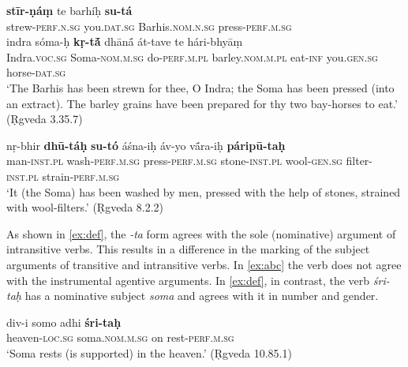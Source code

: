 \documentclass[output=paper,
modfonts
]{LSP/langsci}
\begin{document}
\begin{exe}
	\ex\label{ex:abc}
	\begin{xlist}
		\ex\label{ex:stirnam}\gll \textbf{stīr-ṇáṃ} te barhíḥ \textbf{su-tá}  \\
		strew-\textsc{perf.n.sg} you.\textsc{dat.sg} Barhis.\textsc{nom.n.sg} press-\textsc{perf.m.sg} \\
		
		\gll indra sóma-ḥ  \textbf{kṛ-tā́} dhānā́ át-tave  te hári-bhyāṃ\\
Indra.\textsc{voc.sg} Soma-\textsc{nom.m.sg}  do-\textsc{perf.m.pl}  barley.\textsc{nom.m.pl} eat-\textsc{inf}  you.\textsc{gen.sg} horse-\textsc{dat.sg}\\
\glt `The Barhis has been strewn for thee, O Indra; the Soma  has been pressed (into an extract). The barley grains  have been prepared for thy two bay-horses to eat.' (Ṛgveda 3.35.7)

		\ex\label{ex:nrbhir}\gll nṛ-bhir \textbf{dhū-táḥ}  \textbf{su-tó}  áśna-iḥ áv-yo vā́ra-iḥ \textbf{páripū-taḥ}  \\
		man-\textsc{inst.pl}  wash-\textsc{perf.m.sg}  press-\textsc{perf.m.sg}  stone-\textsc{inst.pl}  wool-\textsc{gen.sg}  filter-\textsc{inst.pl}  strain-\textsc{perf.m.sg} \\
		\glt `It (the Soma) has been washed  by men, pressed with the help of stones, strained with  wool-filters.' (Ṛgveda 8.2.2)
	\end{xlist}
\end{exe}


As shown in \cref{ex:def}, the \textit{-ta} form agrees with the sole
(nominative) argument of intransitive verbs. This results in a
difference in the marking of the subject arguments of transitive and
intransitive verbs. In \cref{ex:abc} the verb does not agree with the
instrumental agentive arguments.  In \cref{ex:def}, in contrast, the
verb \textit{śri-taḥ} has a nominative subject \textit{soma}  and
agrees with it in number and gender. 

\begin{exe}
\ex\label{ex:def}\gll div-i somo adhi \textbf{śri-taḥ} \\
heaven-\textsc{loc.sg} soma.\textsc{nom.m.sg} on rest-\textsc{perf.m.sg} \\
\glt `Soma rests (is supported) in the heaven.' (Ṛgveda 10.85.1)
\end{exe}
\end{document}
